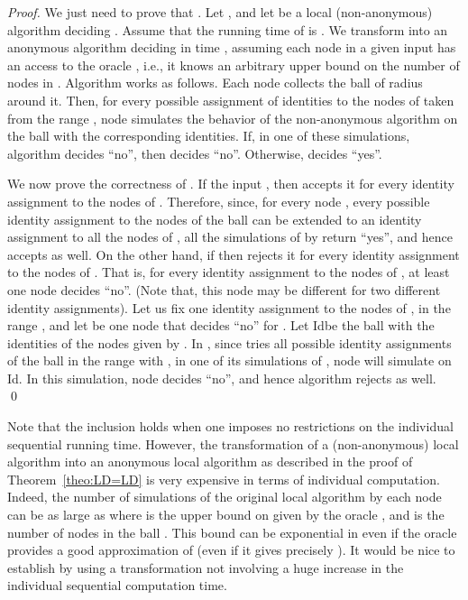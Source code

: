 \documentclass{llncs}
\newcommand{\id}{\mbox{\rm Id}}
\begin{document}
\begin{proof}
We just need to prove that . Let , and let  be a local (non-anonymous) algorithm deciding . Assume that the running time of  is . We transform  into an anonymous algorithm  deciding  in time ,  assuming each node  in a given input  has an access to the oracle , i.e., it knows an arbitrary upper bound  on the number of nodes in . 
Algorithm  works as follows. Each node  collects the ball  of radius  around it. Then, for every possible assignment of identities to the nodes of   taken from the range , node  simulates the behavior of the non-anonymous algorithm  on the ball  with the corresponding identities. If, in one of these simulations, algorithm  decides ``no'', then  decides ``no''. Otherwise,  decides ``yes''. 

We now prove the correctness of . If the input , then  accepts it for every identity assignment to the nodes of . Therefore, since, for every node , every possible identity assignment to the nodes of the ball  can be extended to an  identity assignment to all the nodes of , all the simulations of  by  return ``yes'', and hence  accepts  as well. On the other hand, if   then  rejects it for every identity assignment to the nodes of . That is, for every identity assignment to the nodes of , at least one node  decides ``no''. (Note that, this node  may be different for two different identity assignments). Let us fix one identity assignment  to the nodes of , in the range , and let  be one node that decides ``no'' for . Let \id be the ball  with the identities of the nodes given by . In , since  tries all possible identity assignments of the ball  in the range  with , in one of its simulations of , node  will simulate  on \id. In this simulation, node  decides ``no'', and hence algorithm  rejects  as well. 
\qed
\end{proof}

Note that the inclusion  holds when one imposes no restrictions on the individual sequential running time. However, the transformation of a (non-anonymous) local algorithm into an anonymous local algorithm as described in the proof of Theorem~\ref{theo:LD=LD} is very expensive in terms of individual computation. Indeed, the number of simulations of the original local algorithm  by each node  can be as large as  where  is the upper bound on  given by the oracle , and  is the number of nodes in the ball . This bound can be exponential in  even if the oracle provides a good approximation of  (even if it gives precisely ). It would be nice to establish  by using a transformation not involving a huge increase in the individual sequential computation time. 
\end{document}

